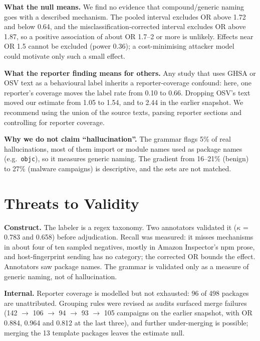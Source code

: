 \documentclass[10pt,conference]{IEEEtran}
\begin{document}
\textbf{What the null means.} We find no evidence that compound/generic
naming goes with a described mechanism. The pooled interval excludes OR
above 1.72 and below 0.64, and the misclassification-corrected interval
excludes OR above 1.87, so a positive association of about OR 1.7--2 or
more is unlikely. Effects near OR 1.5 cannot be excluded (power 0.36); a
cost-minimising attacker model~\cite{allodi2022} could motivate only such
a small effect.

\textbf{What the reporter finding means for others.} Any study that uses
GHSA or OSV text as a behavioural label inherits a reporter-coverage
confound: here, one reporter's coverage moves the label rate from 0.10 to
0.66. Dropping OSV's text moved our estimate from 1.05 to 1.54, and to
2.44 in the earlier snapshot. We recommend using the union of the source
texts, parsing reporter sections and controlling for reporter coverage.

\textbf{Why we do not claim ``hallucination''.} The grammar flags 5\% of
real hallucinations, most of them import or module names used as package
names (e.g.\ \texttt{objc}), so it measures generic naming. The gradient from
16--21\% (benign) to 27\% (malware campaigns) is descriptive, and the sets
are not matched.

\section{Threats to Validity}
\label{sec:threats}

\textbf{Construct.} The labeler is a regex taxonomy. Two annotators
validated it ($\kappa$ = 0.783 and 0.658) before adjudication. Recall was
measured: it misses mechanisms in about four of ten sampled negatives,
mostly in Amazon Inspector's npm prose, and host-fingerprint sending has no
category; the corrected OR bounds the effect. Annotators saw package
names. The grammar is validated only as a measure of
generic naming, not of hallucination.

\textbf{Internal.} Reporter coverage is modelled but not exhausted: 96 of
498 packages are unattributed. Grouping rules were revised as audits
surfaced merge failures (142 $\rightarrow$ 106
$\rightarrow$ 94 $\rightarrow$ 93 $\rightarrow$ 105 campaigns on the earlier
snapshot, with OR 0.884, 0.964 and 0.812 at the last three), and further
under-merging is possible; merging the 13 template packages leaves the
estimate null.
\end{document}
